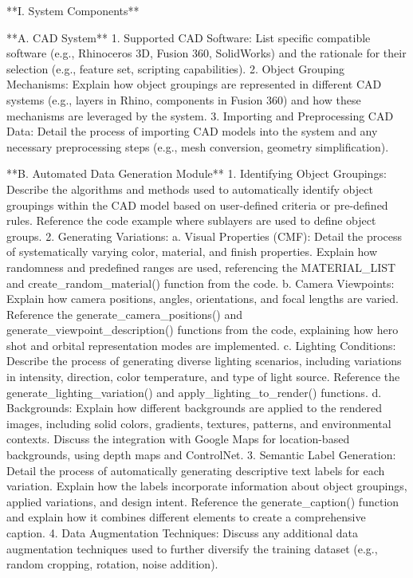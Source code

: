 \documentclass{article}
\begin{document}
**I. System Components**

   **A. CAD System**
      1. Supported CAD Software:  List specific compatible software (e.g., Rhinoceros 3D, Fusion 360, SolidWorks) and the rationale for their selection (e.g., feature set, scripting capabilities).
      2. Object Grouping Mechanisms: Explain how object groupings are represented in different CAD systems (e.g., layers in Rhino, components in Fusion 360) and how these mechanisms are leveraged by the system.
      3. Importing and Preprocessing CAD Data: Detail the process of importing CAD models into the system and any necessary preprocessing steps (e.g., mesh conversion, geometry simplification).

   **B. Automated Data Generation Module**
      1. Identifying Object Groupings: Describe the algorithms and methods used to automatically identify object groupings within the CAD model based on user-defined criteria or pre-defined rules.  Reference the code example where sublayers are used to define object groups.
      2. Generating Variations:
         a. Visual Properties (CMF): Detail the process of systematically varying color, material, and finish properties. Explain how randomness and predefined ranges are used, referencing the MATERIAL_LIST and create_random_material() function from the code.
         b. Camera Viewpoints: Explain how camera positions, angles, orientations, and focal lengths are varied.  Reference the generate_camera_positions() and generate_viewpoint_description() functions from the code, explaining how hero shot and orbital representation modes are implemented.
         c. Lighting Conditions: Describe the process of generating diverse lighting scenarios, including variations in intensity, direction, color temperature, and type of light source.  Reference the generate_lighting_variation() and apply_lighting_to_render() functions.
         d. Backgrounds:  Explain how different backgrounds are applied to the rendered images, including solid colors, gradients, textures, patterns, and environmental contexts.  Discuss the integration with Google Maps for location-based backgrounds, using depth maps and ControlNet.
      3. Semantic Label Generation: Detail the process of automatically generating descriptive text labels for each variation. Explain how the labels incorporate information about object groupings, applied variations, and design intent. Reference the generate_caption() function and explain how it combines different elements to create a comprehensive caption.
      4. Data Augmentation Techniques: Discuss any additional data augmentation techniques used to further diversify the training dataset (e.g., random cropping, rotation, noise addition).
\end{document}
